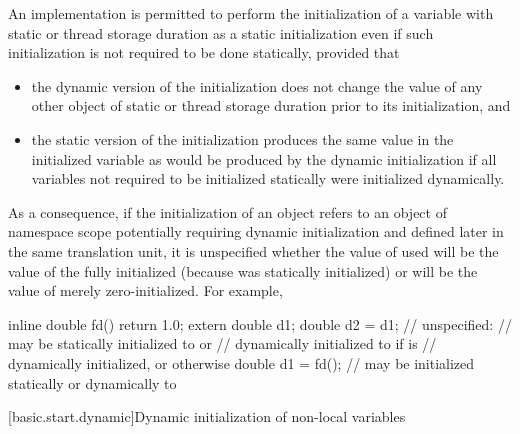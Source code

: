 \pnum
An implementation is permitted to perform the initialization of a
variable with static or thread storage duration as a static
initialization even if such initialization is not required to be done
statically, provided that

\begin{itemize}
\item
the dynamic version of the initialization does not change the
value of any other object of static or thread storage duration
prior to its initialization, and

\item
the static version of the initialization produces the same value
in the initialized variable as would be produced by the dynamic
initialization if all variables not required to be initialized statically
were initialized dynamically.
\end{itemize}

\enternote As a consequence, if the initialization of an object  refers to an
object  of namespace scope potentially requiring dynamic initialization and defined
later in the same translation unit, it is unspecified whether the value of  used
will be the value of the fully initialized  (because  was statically
initialized) or will be the value of  merely zero-initialized. For example,

\begin{codeblock}
inline double fd() { return 1.0; }
extern double d1;
double d2 = d1;     // unspecified:
                    // may be statically initialized to  or
                    // dynamically initialized to  if  is
                    // dynamically initialized, or  otherwise
double d1 = fd();   // may be initialized statically or dynamically to 
\end{codeblock}
\exitnote

[basic.start.dynamic]{Dynamic initialization of non-local variables}

